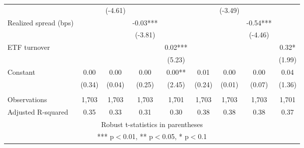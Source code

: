 \documentclass[]{article}
\begin{document}
\begin{tabular}{lcccccccc}
 &  & (-4.61) &  &  &  & (-3.49) &  &  \\
Realized spread (bps) &  &  & -0.03*** &  &  &  & -0.54*** &  \\
 &  &  & (-3.81) &  &  &  & (-4.46) &  \\
ETF turnover &  &  &  & 0.02*** &  &  &  & 0.32* \\
 &  &  &  & (5.23) &  &  &  & (1.99) \\
Constant & 0.00 & 0.00 & 0.00 & 0.00** & 0.01 & 0.00 & 0.00 & 0.04 \\
 & (0.34) & (0.04) & (0.25) & (2.45) & (0.24) & (0.01) & (0.07) & (1.36) \\
 &  &  &  &  &  &  &  &  \\
Observations & 1,703 & 1,703 & 1,703 & 1,701 & 1,703 & 1,703 & 1,703 & 1,701 \\
 Adjusted R-squared & 0.35 & 0.33 & 0.31 & 0.30 & 0.38 & 0.38 & 0.38 & 0.37 \\ \hline
\multicolumn{9}{c}{ Robust t-statistics in parentheses} \\
\multicolumn{9}{c}{ *** p$<$0.01, ** p$<$0.05, * p$<$0.1} \\
\end{tabular}
\end{document}
